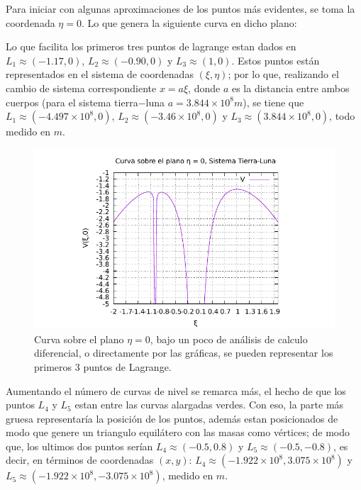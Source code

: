 \begin{multicols}{2}
Para iniciar con algunas aproximaciones de los puntos más evidentes, se toma la coordenada $\eta = 0$. Lo que genera la siguiente curva en dicho plano: 

Lo que facilita los primeros tres puntos de lagrange estan dados en $L_1 \approx (-1.17,0)$, $L_2 \approx (-0.90,0)$ y $L_3 \approx (1,0)$. Estos puntos están representados en el sistema de coordenadas $(\xi ,\eta)$; por lo que, realizando el cambio de sistema correspondiente $x = a\xi$, donde $a$ es la distancia entre ambos cuerpos (para el sistema tierra$-$luna $a = 3.844\times 10^{8} m$), se tiene que $L_1 \approx (-4.497\times 10^{8},0)$, $L_2 \approx (-3.46\times 10^{8},0)$ y $L_3 \approx (3.844\times 10^{8},0)$, todo medido en $m$.
\columnbreak
\begin{figure}[H]
	\centering
	\includegraphics[scale=0.7]{Codigos/planePlotTierraLuna.pdf}
	\caption{Curva sobre el plano $\eta = 0$, bajo un poco de análisis de calculo diferencial, o directamente por las gráficas, se pueden representar los primeros $3$ puntos de Lagrange.}
	\label{fig:planeplot t-l}
\end{figure}
\end{multicols}

Aumentando el número de curvas de nivel se remarca más, el hecho de que los puntos $L_4$ y $L_5$ estan entre las curvas alargadas verdes. Con eso, la parte más gruesa representaría la posición de los puntos, además estan posicionados de modo que genere un triangulo equilátero con las masas como vértices; de modo que, los ultimos dos puntos serían $L_4 \approx (-0.5,0.8)$ y $L_5 \approx (-0.5,-0.8)$, es decir, en términos de coordenadas $(x,y)$: $L_4 \approx (-1.922\times 10^{8},3.075 \times 10^{8})$ y $L_5 \approx (-1.922 \times 10^{8},-3.075 \times 10^{8})$, medido en $m$.





